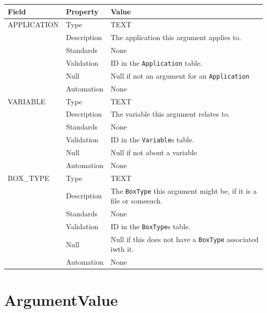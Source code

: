 \documentclass[
]{article}
\newcounter{none}
\begin{document}
{\def\LTcaptype{none} 
\begin{longtable}[]{@{}
  >{\raggedright\arraybackslash}p{}
  >{\raggedright\arraybackslash}p{}
  >{\raggedright\arraybackslash}p{}@{}}
\toprule\noalign{}
\begin{minipage}[b]{\linewidth}\raggedright
Field
\end{minipage} & \begin{minipage}[b]{\linewidth}\raggedright
Property
\end{minipage} & \begin{minipage}[b]{\linewidth}\raggedright
Value
\end{minipage} \\
\midrule\noalign{}
\endhead
\bottomrule\noalign{}
\endlastfoot
APPLICATION & Type & TEXT \\
& Description & The application this argument applies to. \\
& Standards & None \\
& Validation & ID in the \texttt{Application} table. \\
& Null & Null if not an argument for an \texttt{Application} \\
& Automation & None \\
VARIABLE & Type & TEXT \\
& Description & The variable this argument relates to. \\
& Standards & None \\
& Validation & ID in the \texttt{Variable}s table. \\
& Null & Null if not about a variable \\
& Automation & None \\
BOX\_TYPE & Type & TEXT \\
& Description & The \texttt{BoxType} this argument might be, if it is a
file or somesuch. \\
& Standards & None \\
& Validation & ID in the \texttt{BoxType}s table. \\
& Null & Null if this does not have a \texttt{BoxType} associated iwth
it. \\
& Automation & None \\
\end{longtable}
}

\section{ArgumentValue}\label{argumentvalue}
\end{document}
